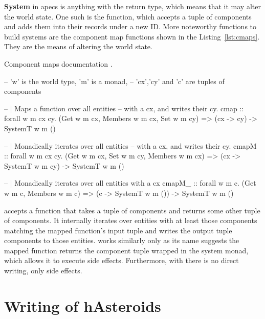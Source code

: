 \documentclass[
  digital, %
  color,   %
  table,   %
  oneside, %
  lof,     %
  lot,     %
]{fithesis3}
\begin{document}
\textbf{System} in apecs is anything with the  return type, which
means that it may alter the world state.
One such  is the  function, which
accepts a tuple of components and adds them into their records under a new ID.
More noteworthy functions to build systems are the component map functions
shown in the Listing~\ref{lst:cmaps}. They are the means of altering the world state.
\begin{listing}[H]
\caption{Component maps documentation \cite{apecsdocs}.}
\begin{haskell}
-- 'w' is the world type, 'm' is a monad,
-- 'cx','cy' and 'c' are tuples of components

-- | Maps a function over all entities
--   with a cx, and writes their cy.
cmap :: forall w m cx cy.
    (Get w m cx, Members w m cx, Set w m cy) =>
    (cx -> cy) -> SystemT w m ()

-- | Monadically iterates over all entities
--   with a cx, and writes their cy.
cmapM :: forall w m cx cy.
    (Get w m cx, Set w m cy, Members w m cx) =>
    (cx -> SystemT w m cy) -> SystemT w m ()

-- | Monadically iterates over all entities with a cx
cmapM_ :: forall w m c.
    (Get w m c, Members w m c) =>
    (c -> SystemT w m ()) -> SystemT w m ()
\end{haskell}
\label{lst:cmaps}
\end{listing}
 accepts a function that takes a tuple of components
and returns some other tuple of components. It internally iterates
over entities with at least those components matching the mapped
function's input tuple and writes the output tuple components
to those entities.  works similarly
only as its name suggests the mapped function returns the component
tuple wrapped in the system monad, which allows it to execute side effects.
Furthermore, with  there is no direct writing, only side effects.



\section{Writing of hAsteroids}
\end{document}

